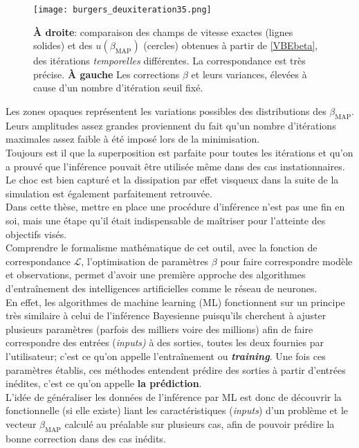 \documentclass[a4paper,12pt]{article}
\newcommand{\bepar}[1]{
	\left( #1 \right)  
}
\newcommand{\bmap}{\beta_{\text{MAP}}}
\numberwithin{equation}{section} %
\begin{document}
\begin{figure}[!ht]
\vspace{-5mm}
\centering
\texttt{[image: burgers\_deuxiteration35.png]}
\caption{\small{\textbf{À droite}: comparaison des champs de vitesse exactes (lignes solides) et des $u\bepar{\bmap}$ (cercles) obtenues à partir de \eqref{VBEbeta}, des itérations \textit{temporelles} différentes. La correspondance est très précise. \textbf{À gauche} Les corrections $\beta$ et leurs variances, élevées à cause d'un nombre d'itération seuil fixé.}}
\label{burger2it}
\end{figure}

Les zones opaques représentent les variations possibles des distributions des $\bmap$. Leurs amplitudes assez grandes proviennent du fait qu'un nombre d'itérations maximales assez faible à été imposé lors de la minimisation.\\ 
Toujours est il que la superposition est parfaite pour toutes les itérations et qu'on a prouvé que l'inférence pouvait être utilisée même dans des cas instationnaires.\\
Le choc est bien capturé et la dissipation par effet visqueux dans la suite de la simulation est également parfaitement retrouvée.\\

\noindent Dans cette thèse, mettre en place une procédure d'inférence n'est pas une fin en soi, mais une étape qu'il était indispensable de maîtriser pour l'atteinte des objectifs visés.\\
Comprendre le formalisme mathématique de cet outil, avec la fonction de correspondance $\mathcal{L}$, l'optimisation de paramètres $\beta$ pour faire correspondre modèle et observations, permet d'avoir une première approche des algorithmes d'entraînement des intelligences artificielles comme le réseau de neurones.\\
En effet, les algorithmes de machine learning (ML) fonctionnent sur un principe très similaire à celui de l'inférence Bayesienne puisqu'ils cherchent à ajuster plusieurs paramètres (parfois des milliers voire des millions) afin de faire correspondre des entrées (\textit{inputs)} à des sorties, toutes les deux fournies par l'utilisateur; c'est ce qu'on appelle l'entraînement ou \textbf{\textit{training}}. Une fois ces paramètres établis, ces méthodes entendent prédire des sorties à partir d'entrées inédites, c'est ce qu'on appelle \textbf{la prédiction}.\\

\noindent L'idée de généraliser les données de l'inférence par ML est donc de découvrir la fonctionnelle (si elle existe) liant les caractéristiques (\textit{inputs}) d'un problème et le vecteur $\bmap$ calculé au préalable sur plusieurs cas, afin de pouvoir prédire la bonne correction dans des cas inédits.
 
\end{document}
